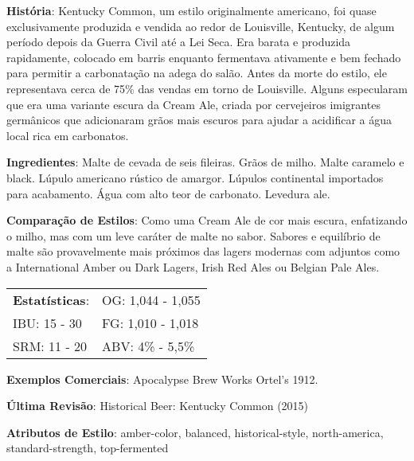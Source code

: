 \textbf{História}: Kentucky Common, um estilo originalmente americano, foi quase exclusivamente produzida e vendida ao redor de Louisville, Kentucky, de algum período depois da Guerra Civil até a Lei Seca. Era barata e produzida rapidamente, colocado em barris enquanto fermentava ativamente e bem fechado para permitir a carbonatação na adega do salão. Antes da morte do estilo, ele representava cerca de 75\% das vendas em torno de Louisville. Alguns especularam que era uma variante escura da Cream Ale, criada por cervejeiros imigrantes germânicos que adicionaram grãos mais escuros para ajudar a acidificar a água local rica em carbonatos.

\textbf{Ingredientes}: Malte de cevada de seis fileiras. Grãos de milho. Malte caramelo e black. Lúpulo americano rústico de amargor. Lúpulos continental importados para acabamento. Água com alto teor de carbonato. Levedura ale.

\textbf{Comparação de Estilos}: Como uma Cream Ale de cor mais escura, enfatizando o milho, mas com um leve caráter de malte no sabor. Sabores e equilíbrio de malte são provavelmente mais próximos das lagers modernas com adjuntos como a International Amber ou Dark Lagers, Irish Red Ales ou Belgian Pale Ales.

\begin{tabular}{@{}p{35mm}p{35mm}@{}}
  \textbf{Estatísticas}: & OG: 1,044 - 1,055  \\
  IBU: 15 - 30  & FG: 1,010 - 1,018  \\
  SRM: 11 - 20 & ABV: 4\% - 5,5\%
\end{tabular}

\textbf{Exemplos Comerciais}: Apocalypse Brew Works Ortel's 1912.

\textbf{Última Revisão}: Historical Beer: Kentucky Common (2015)

\textbf{Atributos de Estilo}: amber-color, balanced, historical-style, north-america, standard-strength, top-fermented
